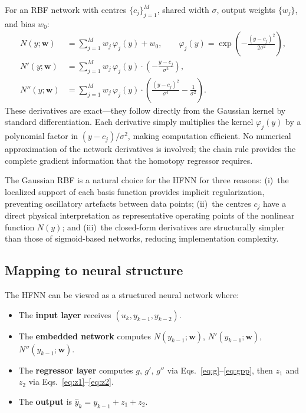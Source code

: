 \documentclass[preprint,12pt]{elsarticle}
\begin{document}
For an RBF network with centres $\{c_j\}_{j=1}^M$, shared width $\sigma$, output weights $\{w_j\}$, and bias $w_0$:
\begin{align}
N(y;\mathbf{w}) &= \sum_{j=1}^{M} w_j\, \varphi_j(y) + w_0, \qquad \varphi_j(y) = \exp\!\left(-\frac{(y - c_j)^2}{2\sigma^2}\right), \label{eq:N}\\[4pt]
N'(y;\mathbf{w}) &= \sum_{j=1}^{M} w_j\, \varphi_j(y) \cdot \left(-\frac{y - c_j}{\sigma^2}\right), \label{eq:Np}\\[4pt]
N''(y;\mathbf{w}) &= \sum_{j=1}^{M} w_j\, \varphi_j(y) \cdot \left(\frac{(y - c_j)^2}{\sigma^4} - \frac{1}{\sigma^2}\right). \label{eq:Npp}
\end{align}
These derivatives are exact---they follow directly from the Gaussian kernel by standard differentiation. Each derivative simply multiplies the kernel $\varphi_j(y)$ by a polynomial factor in $(y - c_j)/\sigma^2$, making computation efficient. No numerical approximation of the network derivatives is involved; the chain rule provides the complete gradient information that the homotopy regressor requires.

The Gaussian RBF is a natural choice for the HFNN for three reasons: (i)~the localized support of each basis function provides implicit regularization, preventing oscillatory artefacts between data points; (ii)~the centres $c_j$ have a direct physical interpretation as representative operating points of the nonlinear function $N(y)$; and (iii)~the closed-form derivatives are structurally simpler than those of sigmoid-based networks, reducing implementation complexity.

\subsection{Mapping to neural structure}
The HFNN can be viewed as a structured neural network where:
\begin{itemize}
\item The \textbf{input layer} receives $(u_k, y_{k-1}, y_{k-2})$.
\item The \textbf{embedded network} computes $N(y_{k-1};\mathbf{w})$, $N'(y_{k-1};\mathbf{w})$, $N''(y_{k-1};\mathbf{w})$.
\item The \textbf{regressor layer} computes $g$, $g'$, $g''$ via Eqs.~\eqref{eq:g}--\eqref{eq:gpp}, then $z_1$ and $z_2$ via Eqs.~\eqref{eq:z1}--\eqref{eq:z2}.
\item The \textbf{output} is $\hat{y}_k = y_{k-1} + z_1 + z_2$.
\end{itemize}
\end{document}
